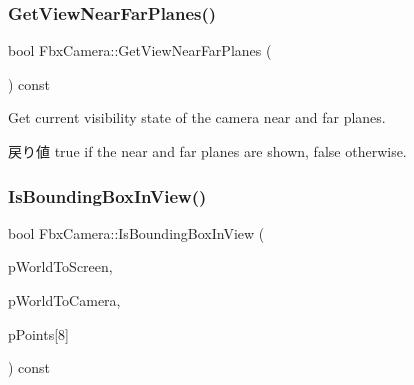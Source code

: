 \subsubsection{\texorpdfstring{Get\+View\+Near\+Far\+Planes()}{GetViewNearFarPlanes()}}
{\footnotesize\ttfamily bool Fbx\+Camera\+::\+Get\+View\+Near\+Far\+Planes (\begin{DoxyParamCaption}{ }\end{DoxyParamCaption}) const}

Get current visibility state of the camera near and far planes. \begin{DoxyReturn}{戻り値}
{\ttfamily true} if the near and far planes are shown, {\ttfamily false} otherwise. 
\end{DoxyReturn}
\mbox{\label{class_fbx_camera_a19568019c2c2be2188688ad1c059a9b7}} 
\subsubsection{\texorpdfstring{Is\+Bounding\+Box\+In\+View()}{IsBoundingBoxInView()}}
{\footnotesize\ttfamily bool Fbx\+Camera\+::\+Is\+Bounding\+Box\+In\+View (\begin{DoxyParamCaption}\item[{const \hyperlink{class_fbx_matrix}{Fbx\+Matrix} \&}]{p\+World\+To\+Screen,  }\item[{const \hyperlink{class_fbx_matrix}{Fbx\+Matrix} \&}]{p\+World\+To\+Camera,  }\item[{const \hyperlink{class_fbx_vector4}{Fbx\+Vector4}}]{p\+Points\mbox{[}8\mbox{]} }\end{DoxyParamCaption}) const}

